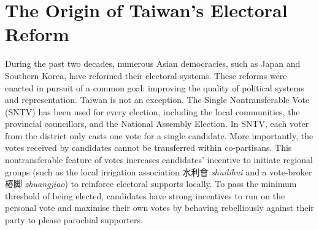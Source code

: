 
\section*{\centering The Origin of Taiwan's Electoral Reform}

During the past two decades, numerous Asian democracies, such as Japan and Southern Korea, have reformed their electoral systems. These reforms were enacted in pursuit of a common goal: improving the quality of political systems and representation. Taiwan is not an exception. The Single Nontransferable Vote (SNTV) has been used for every election, including the local communities, the provincial councillors, and the National Assembly Election. In SNTV, each voter from the district only casts one vote for a single candidate. More importantly, the votes received by candidates cannot be transferred within co-partisans. This nontransferable feature of votes increases candidates' incentive to initiate regional groups (such as the local irrigation association 水利會 \textit{shuilihui} and a vote-broker 樁脚 \textit{zhuangjiao}) to reinforce electoral supports locally. To pass the minimum threshold of being elected, candidates have strong incentives to run on the personal vote and maximise their own votes by behaving rebelliously against their party to please parochial supporters. 

